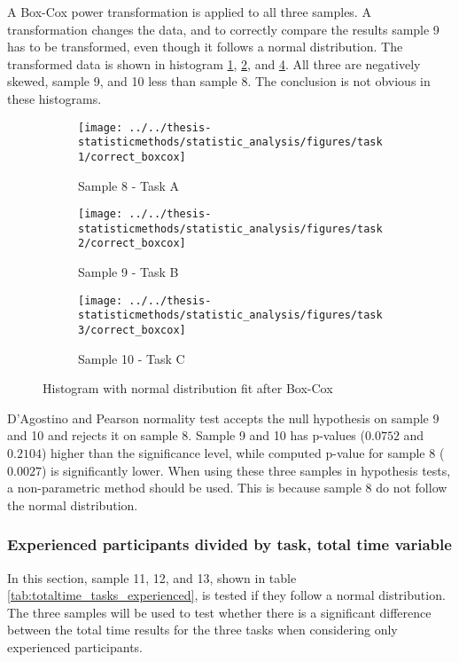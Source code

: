 A Box-Cox power transformation is applied to all three samples. A transformation changes the data, and to correctly compare the results sample 9 has to be transformed, even though it follows a normal distribution. The transformed data is shown in histogram \ref{fig:correctboxcox_task1}, \ref{fig:correctboxcox_task2}, and \ref{fig:correctboxcox_task3}. All three are negatively skewed, sample 9, and 10 less than sample 8. The conclusion is not obvious in these histograms.

\begin{figure}[H]
	\centering
	\begin{subfigure}[b]{0.32\textwidth}
		\centering
		\texttt{[image: ../../thesis-statisticmethods/statistic\_analysis/figures/task1/correct\_boxcox]}
		\caption{Sample 8 - Task A}
		\label{fig:correctboxcox_task1}
	\end{subfigure}
	\begin{subfigure}[b]{0.32\textwidth}
		\centering
		\texttt{[image: ../../thesis-statisticmethods/statistic\_analysis/figures/task2/correct\_boxcox]}
		\caption{Sample 9 - Task B}
		\label{fig:correctboxcox_task2}
	\end{subfigure}
	\begin{subfigure}[b]{0.32\textwidth}
		\centering
		\texttt{[image: ../../thesis-statisticmethods/statistic\_analysis/figures/task3/correct\_boxcox]}
		\caption{Sample 10 - Task C}
		\label{fig:correctboxcox_task3}
	\end{subfigure}
	\caption{Histogram with normal distribution fit after Box-Cox}
\end{figure}

D'Agostino and Pearson normality test accepts the null hypothesis on sample 9 and 10 and rejects it on sample 8. Sample 9 and 10 has p-values ($0.0752$ and $0.2104$) higher than the significance level, while computed p-value for sample 8 ($0.0027$) is significantly lower. When using these three samples in hypothesis tests, a non-parametric method should be used. This is because sample 8 do not follow the normal distribution.

\subsubsection[Sample 11, 12 and 13]{Experienced participants divided by task, total time variable}
In this section, sample 11, 12, and 13, shown in table \ref{tab:totaltime_tasks_experienced}, is tested if they follow a normal distribution. The three samples will be used to test whether there is a significant difference between the total time results for the three tasks when considering only experienced participants. 


